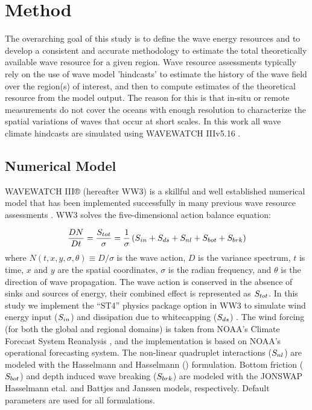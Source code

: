 \section{Method} \label{sec:method}
The overarching goal of this study is to define the wave energy resources and to develop a consistent and accurate methodology to estimate the total theoretically available wave resource for a given region. 
Wave resource assessments typically rely on the use of wave model 'hindcasts' to estimate the history of the wave field over the region(s) of interest, and then to compute estimates of the theoretical resource from the model output. The reason for this is that in-situ or remote measurements do not cover the oceans with enough resolution to characterize the spatial variations of waves that occur at short scales. 
In this work all wave climate hindcasts are simulated using WAVEWATCH III\textregistered v5.16 \citep{tolmanDistributedmemoryConceptsWave2002}.

\subsection{Numerical Model} \label{sec:method:model}
WAVEWATCH III® (hereafter WW3) is a skillful and well established numerical model that has been implemented successfully in many previous wave resource assessments \citep[e.g.,][]{garcia-medinaWaveResourceAssessment2014,yangWaveModelTest2017}.
WW3 solves the five-dimensional action balance equation:

\begin{align}
  \frac{DN}{Dt} = \frac{S_{ tot }}{\sigma} = \frac{1}{\sigma}\left ( S_{ in } + S_{ ds } + S_{ nl } + S_{ bot } + S_{ brk } \right )
\end{align}
where $N(t,x,y,\sigma,\theta) \equiv D/\sigma$ is the wave action, $D$ is the variance spectrum, $t$ is time, $x$ and $y$ are the spatial coordinates, $\sigma$ is the radian frequency, and $\theta$ is the direction of wave propagation.
The wave action is conserved in the absence of sinks and sources of energy, their combined effect is represented as $S_{ tot }$. In this study we implement the ``ST4'' physics package option in WW3 to simulate wind energy input ($S_{ in }$) and dissipation due to whitecapping ($S_{ ds }$) \citep{ardhuinObservationSwellDissipation2009}.
The wind forcing (for both the global and regional domains) is taken from NOAA's Climate Forecast System Reanalysis \citep{sahaNCEPClimateForecast2010}, and the implementation is based on NOAA's operational forecasting system.
The non-linear quadruplet interactions ($S_{ nl }$) are modeled with the Hasselmann and Hasselmann (\citeyear{hasselmannComputationsParameterizationsNonlinear1985}) formulation.
Bottom friction ($S_{ bot }$) and depth induced wave breaking ($S_{ brk }$) are modeled with the JONSWAP Hasselmann etal. \citeyear{hasselmannMeasurementsWindwaveGrowth1973} and Battjes and Janssen \citeyear{battjesEnergyLossSetup1978} models, respectively.
Default parameters are used for all formulations. 

